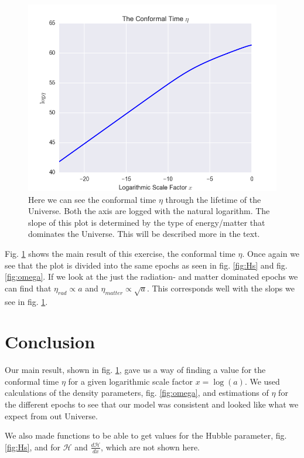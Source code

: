 \documentclass[a4paper,norsk, 10pt]{article}
\begin{document}

\begin{figure}[H]
     \centering
	{\includegraphics[scale=0.5]{eta.png}
	\caption{Here we can see the conformal time $\eta$ through the lifetime of the Universe. Both the axis are logged with the natural logarithm. The slope of this plot is determined by the type of energy/matter that dominates the Universe. This will be described more in the text. }\label{fig:eta}}
\end{figure}

Fig. \ref{fig:eta} shows the main result of this exercise, the conformal time $\eta$. Once again we see that the plot is divided into the same epochs as seen in fig. \ref{fig:Hs} and fig. \ref{fig:omega}. If we look at the just the radiation- and matter dominated epochs we can find that $\eta_{rad} \propto a$ and $\eta_{matter}\propto \sqrt{a}$. This corresponds well with the slops we see in fig. \ref{fig:eta}.


\section{Conclusion}

Our main result, shown in fig. \ref{fig:eta}, gave us a way of finding a value for the conformal time $\eta$ for a given logarithmic scale factor $x = \log(a)$. We used calculations of the density parameters, fig. \ref{fig:omega}, and estimations of $\eta$ for the different epochs to see that our model was consistent and looked like what we expect from out Universe. 

We also made functions to be able to get values for the Hubble parameter, fig. \ref{fig:Hs}, and for $\mathcal{H}$ and $\frac{d\mathcal{H}}{dx}$, which are not shown here.
\end{document}
